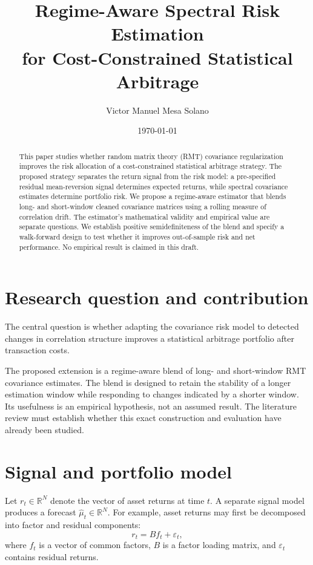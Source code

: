 \documentclass[11pt]{article}
\title{Regime-Aware Spectral Risk Estimation\\
for Cost-Constrained Statistical Arbitrage}
\author{Victor Manuel Mesa Solano}
\date{\today}
\begin{document}
\maketitle

\begin{abstract}
This paper studies whether random matrix theory (RMT) covariance regularization
improves the risk allocation of a cost-constrained statistical arbitrage strategy.
The proposed strategy separates the return signal from the risk model: a
pre-specified residual mean-reversion signal determines expected returns, while
spectral covariance estimates determine portfolio risk. We propose a
regime-aware estimator that blends long- and short-window cleaned covariance
matrices using a rolling measure of correlation drift. The estimator's
mathematical validity and empirical value are separate questions. We establish
positive semidefiniteness of the blend and specify a walk-forward design to test
whether it improves out-of-sample risk and net performance. No empirical result
is claimed in this draft.
\end{abstract}

\section{Research question and contribution}

The central question is whether adapting the covariance risk model to detected
changes in correlation structure improves a statistical arbitrage portfolio after
transaction costs.

The proposed extension is a regime-aware blend of long- and short-window RMT
covariance estimates. The blend is designed to retain the stability of a longer
estimation window while responding to changes indicated by a shorter window.
Its usefulness is an empirical hypothesis, not an assumed result. The literature
review must establish whether this exact construction and evaluation have already
been studied.

\section{Signal and portfolio model}

Let $r_t \in \mathbb{R}^N$ denote the vector of asset returns at time $t$.
A separate signal model produces a forecast $\widehat{\mu}_t \in \mathbb{R}^N$.
For example, asset returns may first be decomposed into factor and residual
components:
\[
    r_t = B f_t + \varepsilon_t,
\]
where $f_t$ is a vector of common factors, $B$ is a factor loading matrix, and
$\varepsilon_t$ contains residual returns.
\end{document}
